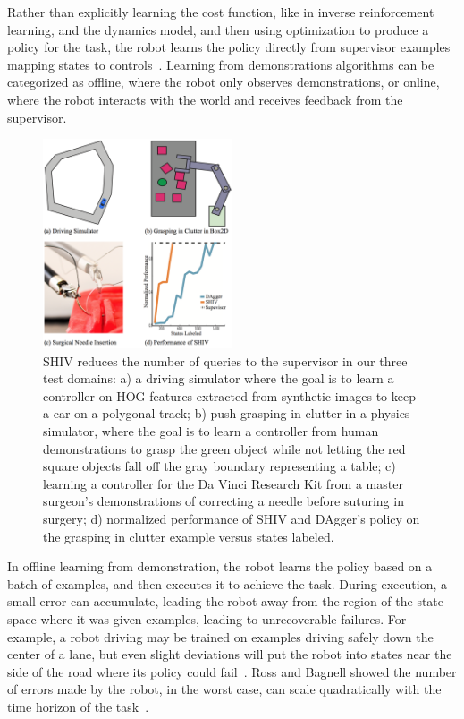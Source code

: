\documentclass[10pt, conference]{ieeeconf}      %
\begin{document}
Rather than explicitly learning the cost function, like in inverse reinforcement learning, and the dynamics model, and then using optimization to produce a policy for the task, the robot learns the policy directly from supervisor examples mapping states to controls~\cite{argall2009survey}. Learning from demonstrations algorithms can be categorized as offline, where the robot only observes demonstrations, or online, where the robot interacts with the world and receives feedback from the supervisor. 


\begin{figure}[ht]
\centering
   
\includegraphics[width=0.5\textwidth]{figures/teaser.pdf}
\caption{ 
SHIV  reduces the number of queries to the supervisor in our three test domains: a) a driving simulator where the goal is to learn a controller on HOG features extracted from synthetic images to keep a car on a polygonal track; b) push-grasping in clutter in a physics simulator, where the goal is to learn a controller from human demonstrations to grasp the green object while not letting the red square objects fall off the gray boundary representing a table; c) learning a controller for the Da Vinci Research Kit from a master surgeon's demonstrations of correcting a needle before suturing in surgery; d) normalized performance of SHIV and DAgger's policy on the grasping in clutter example versus states labeled.
}
\vspace*{-10pt}
\label{fig:teaser}
\end{figure}





In offline learning from demonstration, the robot learns the policy based on a batch of examples, and then executes it to achieve the task.  During execution, a small error can accumulate, leading the robot away from the region of the state space where it was given examples, leading to unrecoverable failures.  For example, a robot driving may be trained on examples driving safely down the center of a lane, but even slight deviations will put the robot into states near the side of the road where its policy could  fail~\cite{pomerleau1989alvinn}. Ross and Bagnell showed the number of errors made by the robot, in the worst case,  can scale quadratically with the time horizon of the task~\cite{ross2010efficient}.
\end{document}
